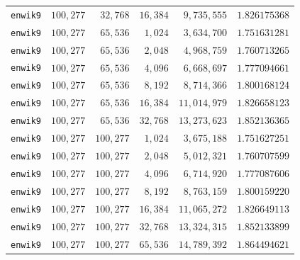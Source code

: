 \begin{longtable}{lrrrrr}
\texttt{enwik9} & $100{,}277$ & $32{,}768$ & $16{,}384$ & $9{,}735{,}555$ & $1.826175368$ \\
\texttt{enwik9} & $100{,}277$ & $65{,}536$ & $1{,}024$ & $3{,}634{,}700$ & $1.751631281$ \\
\texttt{enwik9} & $100{,}277$ & $65{,}536$ & $2{,}048$ & $4{,}968{,}759$ & $1.760713265$ \\
\texttt{enwik9} & $100{,}277$ & $65{,}536$ & $4{,}096$ & $6{,}668{,}697$ & $1.777094661$ \\
\texttt{enwik9} & $100{,}277$ & $65{,}536$ & $8{,}192$ & $8{,}714{,}366$ & $1.800168124$ \\
\texttt{enwik9} & $100{,}277$ & $65{,}536$ & $16{,}384$ & $11{,}014{,}979$ & $1.826658123$ \\
\texttt{enwik9} & $100{,}277$ & $65{,}536$ & $32{,}768$ & $13{,}273{,}623$ & $1.852136365$ \\
\texttt{enwik9} & $100{,}277$ & $100{,}277$ & $1{,}024$ & $3{,}675{,}188$ & $1.751627251$ \\
\texttt{enwik9} & $100{,}277$ & $100{,}277$ & $2{,}048$ & $5{,}012{,}321$ & $1.760707599$ \\
\texttt{enwik9} & $100{,}277$ & $100{,}277$ & $4{,}096$ & $6{,}714{,}920$ & $1.777087606$ \\
\texttt{enwik9} & $100{,}277$ & $100{,}277$ & $8{,}192$ & $8{,}763{,}159$ & $1.800159220$ \\
\texttt{enwik9} & $100{,}277$ & $100{,}277$ & $16{,}384$ & $11{,}065{,}272$ & $1.826649113$ \\
\texttt{enwik9} & $100{,}277$ & $100{,}277$ & $32{,}768$ & $13{,}324{,}315$ & $1.852133899$ \\
\texttt{enwik9} & $100{,}277$ & $100{,}277$ & $65{,}536$ & $14{,}789{,}392$ & $1.864494621$ \\
\end{longtable}
\endgroup

